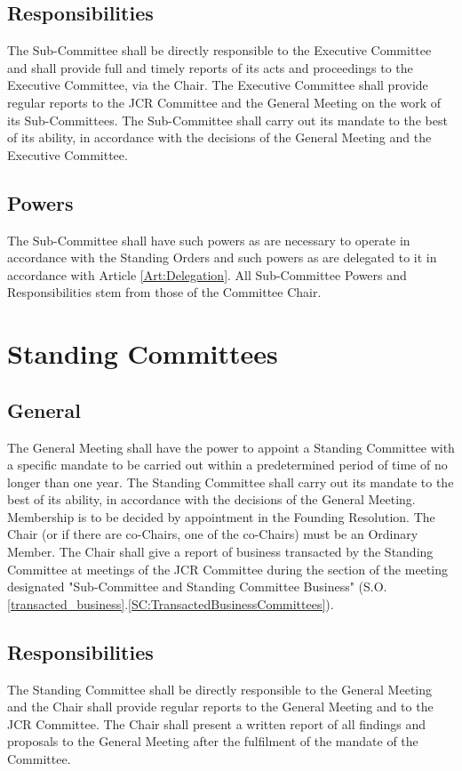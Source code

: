 \subsection{Responsibilities}
\npara \label{resp:subcommittee} The Sub-Committee shall be directly responsible to the Executive Committee and shall provide full and timely reports of its acts and proceedings to the Executive Committee, via the Chair.  The Executive Committee shall provide regular reports to the JCR Committee and the General Meeting on the work of its Sub-Committees.
\npara The Sub-Committee shall carry out its mandate to the best of its ability, in accordance with the decisions of the General Meeting and the Executive Committee.
\subsection{Powers}
\npara The Sub-Committee shall have such powers as are necessary to operate in accordance with the Standing Orders and such powers as are delegated to it in accordance with Article \ref{Art:Delegation}.
All Sub-Committee Powers and Responsibilities stem from those of the Committee Chair.
\section{Standing Committees} \label{sec:StandingCommittees}
\subsection{General}
\npara The General Meeting shall have the power to appoint a Standing Committee with a specific mandate to be carried out within a predetermined period of time of no longer than one year. 
\npara The Standing Committee shall carry out its mandate to the best of its ability, in accordance with the decisions of the General Meeting.
\npara Membership is to be decided by appointment in the Founding Resolution.  The Chair (or if there are co-Chairs, one of the co-Chairs) must be an Ordinary Member.
\npara The Chair shall give a report of business transacted by the Standing Committee at meetings of the JCR Committee during the section of the meeting designated "Sub-Committee and Standing Committee Business" (S.O. \ref{transacted_business}.\ref{SC:TransactedBusinessCommittees}).
\subsection{Responsibilities}
\npara \label{resp:StandingCommittee} The Standing Committee shall be directly responsible to the General Meeting and the Chair shall provide regular reports to the General Meeting and to the JCR Committee.
\npara The Chair shall present a written report of all findings and proposals to the General Meeting after the fulfilment of the mandate of the Committee.

